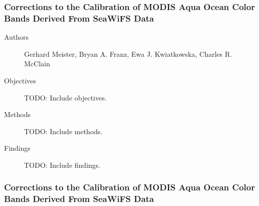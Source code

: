 \begin{frame}\frametitle{Corrections to the Calibration of MODIS Aqua Ocean Color Bands Derived From SeaWiFS Data} 
\begin{description}
    \item[Authors] Gerhard Meister, Bryan A. Franz, Ewa J. Kwiatkowska, Charles R. McClain
    \item[Objectives] TODO: Include objectives.
    \item[Methods] TODO: Include methods.
    \item[Findings] TODO: Include findings.
\end{description}

\end{frame}

\begin{frame}\frametitle{Corrections to the Calibration of MODIS Aqua Ocean Color Bands Derived From SeaWiFS Data} 

\end{frame}

